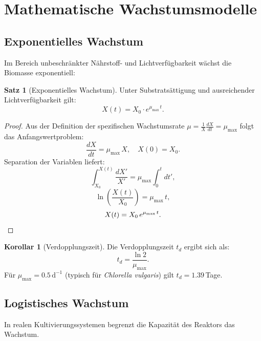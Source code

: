 ﻿\documentclass[a4paper,12pt]{article}
\theoremstyle{definition}
\newtheorem{satz}{Satz}
\newtheorem{korollar}{Korollar}
\begin{document}
\section{Mathematische Wachstumsmodelle}

\subsection{Exponentielles Wachstum}

Im Bereich unbeschränkter Nährstoff- und Lichtverfügbarkeit wächst die Biomasse exponentiell:

\begin{satz}[Exponentielles Wachstum]
	Unter Substratsättigung und ausreichender Lichtverfügbarkeit gilt:
	\[
		X(t) = X_0 \cdot e^{\mu_\mathrm{max}\,t}.
	\]
\end{satz}

\begin{proof}
	Aus der Definition der spezifischen Wachstumsrate $\mu = \frac{1}{X}\frac{dX}{dt} = \mu_\mathrm{max}$
	folgt das Anfangswertproblem:
	\[
		\frac{dX}{dt} = \mu_\mathrm{max}\,X, \quad X(0) = X_0.
	\]
	Separation der Variablen liefert:
	\[
		\int_{X_0}^{X(t)} \frac{dX'}{X'} = \mu_\mathrm{max} \int_0^t dt',
	\]
	\[
		\ln\!\left(\frac{X(t)}{X_0}\right) = \mu_\mathrm{max}\,t,
	\]
	\[
		X(t) = X_0\,e^{\mu_\mathrm{max}\,t}. \qedhere
	\]
\end{proof}

\begin{korollar}[Verdopplungszeit]
	Die Verdopplungszeit $t_d$ ergibt sich als:
	\[
		t_d = \frac{\ln 2}{\mu_\mathrm{max}}.
	\]
	Für $\mu_\mathrm{max} = 0.5\,\mathrm{d}^{-1}$ (typisch für \textit{Chlorella vulgaris}) gilt
	$t_d = 1.39$\,Tage.
\end{korollar}

\subsection{Logistisches Wachstum}

In realen Kultivierungssystemen begrenzt die Kapazität des Reaktors das Wachstum.
\end{document}
